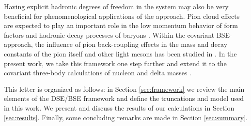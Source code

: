 Having explicit hadronic degrees of freedom in the system may also be very 
beneficial for phenomenological applications of the approach. Pion cloud effects 
are expected to play an important role in the low momentum behavior of 
form factors and hadronic decay processes of baryons
\cite{Thomas:1981vc,Miller:2002ig,Ramalho:2008dp,Cloet:2012cy,Eichmann:2011vu,%
Eichmann:2011aa,Sanchis-Alepuz:2013iia,NDg}. Within the covariant BSE-approach, 
the influence of pion back-coupling effects in the mass and decay 
constants of the pion itself and other light mesons has been studied in \cite{Fischer:2008wy}. 
In the present work, we take this framework one step further and extend it 
to the covariant three-body calculations of nucleon and delta masses 
\cite{Eichmann:2009qa,Eichmann:2009en,SanchisAlepuz:2011jn}. 

This letter is organized as follows: in Section \ref{sec:framework} we review the main elements of the DSE/BSE framework and define the truncations and model used in this work. We present and discuss the results of our calculations in Section \ref{sec:results}. Finally, some concluding remarks are made in Section \ref{sec:summary}.

